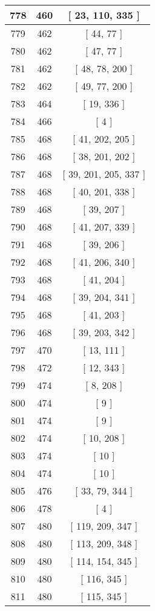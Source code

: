 \begin{center}
\begin{longtable}[H]{|| c c c ||}
\hline
778 & 460 & [ 23, 110, 335 ] \\ 
\hline
779 & 462 & [ 44, 77 ] \\ 
\hline
780 & 462 & [ 47, 77 ] \\ 
\hline
781 & 462 & [ 48, 78, 200 ] \\ 
\hline
782 & 462 & [ 49, 77, 200 ] \\ 
\hline
783 & 464 & [ 19, 336 ] \\ 
\hline
784 & 466 & [ 4 ] \\ 
\hline
785 & 468 & [ 41, 202, 205 ] \\ 
\hline
786 & 468 & [ 38, 201, 202 ] \\ 
\hline
787 & 468 & [ 39, 201, 205, 337 ] \\ 
\hline
788 & 468 & [ 40, 201, 338 ] \\ 
\hline
789 & 468 & [ 39, 207 ] \\ 
\hline
790 & 468 & [ 41, 207, 339 ] \\ 
\hline
791 & 468 & [ 39, 206 ] \\ 
\hline
792 & 468 & [ 41, 206, 340 ] \\ 
\hline
793 & 468 & [ 41, 204 ] \\ 
\hline
794 & 468 & [ 39, 204, 341 ] \\ 
\hline
795 & 468 & [ 41, 203 ] \\ 
\hline
796 & 468 & [ 39, 203, 342 ] \\ 
\hline
797 & 470 & [ 13, 111 ] \\ 
\hline
798 & 472 & [ 12, 343 ] \\ 
\hline
799 & 474 & [ 8, 208 ] \\ 
\hline
800 & 474 & [ 9 ] \\ 
\hline
801 & 474 & [ 9 ] \\ 
\hline
802 & 474 & [ 10, 208 ] \\ 
\hline
803 & 474 & [ 10 ] \\ 
\hline
804 & 474 & [ 10 ] \\ 
\hline
805 & 476 & [ 33, 79, 344 ] \\ 
\hline
806 & 478 & [ 4 ] \\ 
\hline
807 & 480 & [ 119, 209, 347 ] \\ 
\hline
808 & 480 & [ 113, 209, 348 ] \\ 
\hline
809 & 480 & [ 114, 154, 345 ] \\ 
\hline
810 & 480 & [ 116, 345 ] \\ 
\hline
811 & 480 & [ 115, 345 ] \\ 
\hline

\end{longtable}
\end{center}
